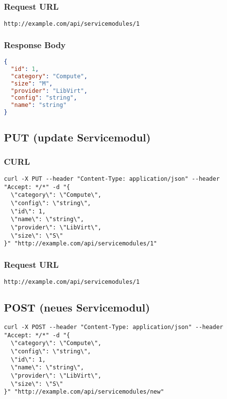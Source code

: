 \subsubsection{Request URL}
\begin{lstlisting}[] 
http://example.com/api/servicemodules/1
\end{lstlisting}


\subsubsection{Response Body}
\begin{lstlisting}[language=json] 
{
  "id": 1,
  "category": "Compute",
  "size": "M",
  "provider": "LibVirt",
  "config": "string",
  "name": "string"
}
\end{lstlisting}


\subsection{PUT (update Servicemodul)}
\subsubsection{CURL}
\begin{lstlisting}[] 
curl -X PUT --header "Content-Type: application/json" --header "Accept: */*" -d "{
  \"category\": \"Compute\",
  \"config\": \"string\",
  \"id\": 1,
  \"name\": \"string\",
  \"provider\": \"LibVirt\",
  \"size\": \"S\"
}" "http://example.com/api/servicemodules/1"
\end{lstlisting}


\subsubsection{Request URL}
\begin{lstlisting}[] 
http://example.com/api/servicemodules/1
\end{lstlisting}

\subsection{POST (neues Servicemodul)}
\begin{lstlisting}[] 
curl -X POST --header "Content-Type: application/json" --header "Accept: */*" -d "{
  \"category\": \"Compute\",
  \"config\": \"string\",
  \"id\": 1,
  \"name\": \"string\",
  \"provider\": \"LibVirt\",
  \"size\": \"S\"
}" "http://example.com/api/servicemodules/new"
\end{lstlisting}


